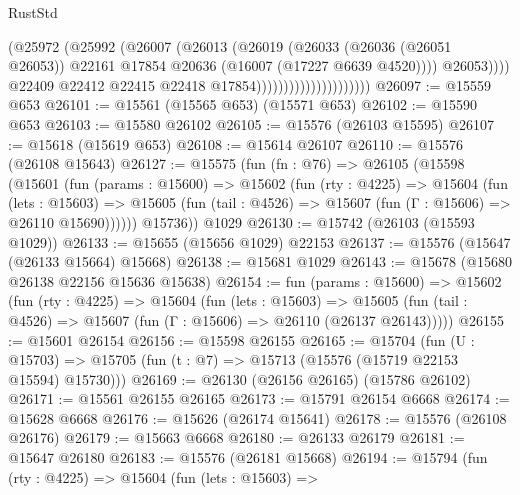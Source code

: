 \begin{lexlean}{RustStd}
\begin{coremodule}
                                              (@25972
                                                (@25992
                                                  (@26007
                                                    (@26013
                                                      (@26019
                                                        (@26033
                                                          (@26036 (@26051 @26053))
                                                          @22161
                                                          @17854
                                                          @20636
                                                          (@16007 (@17227 @6639 @4520))))
                                                      @26053))))
                                              @22409
                                              @22412
                                              @22415
                                              @22418
                                              @17854)))))))))))))))))))))
@26097 := @15559 @653
@26101 := @15561 (@15565 @653) (@15571 @653)
@26102 := @15590 @653
@26103 := @15580 @26102
@26105 := @15576 (@26103 @15595)
@26107 := @15618 (@15619 @653)
@26108 := @15614 @26107
@26110 := @15576 (@26108 @15643)
@26127 := @15575
    (fun (fn : @76) =>
    @26105
      (@15598
        (@15601
          (fun (params : @15600) =>
          @15602
            (fun (rty : @4225) =>
            @15604
              (fun (lets : @15603) =>
              @15605 (fun (tail : @4526) => @15607 (fun (Γ : @15606) => @26110 @15690))))))
        @15736))
    @1029
@26130 := @15742 (@26103 (@15593 @1029))
@26133 := @15655 (@15656 @1029) @22153
@26137 := @15576 (@15647 (@26133 @15664) @15668)
@26138 := @15681 @1029
@26143 := @15678 (@15680 @26138 @22156 @15636 @15638)
@26154 := fun (params : @15600) =>
  @15602
    (fun (rty : @4225) =>
    @15604
      (fun (lets : @15603) =>
      @15605 (fun (tail : @4526) => @15607 (fun (Γ : @15606) => @26110 (@26137 @26143)))))
@26155 := @15601 @26154
@26156 := @15598 @26155
@26165 := @15704
    (fun (U : @15703) => @15705 (fun (t : @7) => @15713 (@15576 (@15719 @22153 @15594) @15730)))
@26169 := @26130 (@26156 @26165) (@15786 @26102)
@26171 := @15561 @26155 @26165
@26173 := @15791 @26154 @6668
@26174 := @15628 @6668
@26176 := @15626 (@26174 @15641)
@26178 := @15576 (@26108 @26176)
@26179 := @15663 @6668
@26180 := @26133 @26179
@26181 := @15647 @26180
@26183 := @15576 (@26181 @15668)
@26194 := @15794
    (fun (rty : @4225) =>
    @15604
      (fun (lets : @15603) =>

\end{coremodule}
\end{lexlean}
